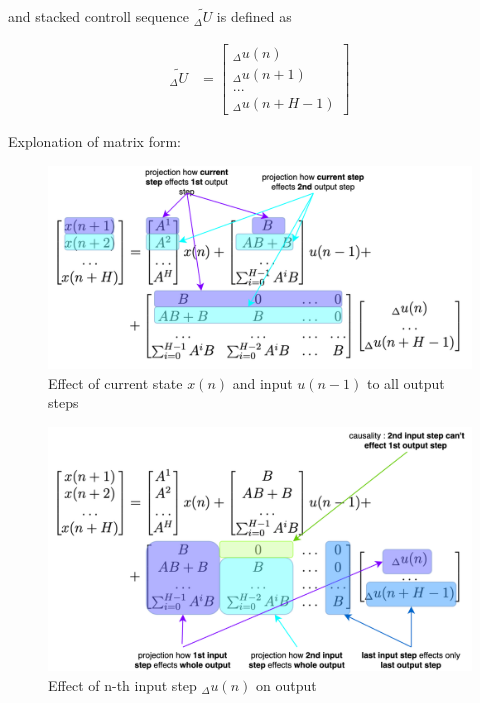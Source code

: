 \documentclass[12pt,twoside,onecolumn,openany,extrafontsizes,dvipsnames]{memoir}
\begin{document}
        and stacked controll sequence $\tilde{_\Delta U}$ is defined as

        \begin{align}   
            \tilde{_\Delta U} &= \begin{bmatrix} _\Delta u(n) \\ _\Delta u(n+1) \\ ... \\ _\Delta u(n+H-1) \end{bmatrix}
            \label{eq:predicted_conrol}
        \end{align}


        Explonation of  matrix form: 
        \begin{figure}[!htb]
            \centering
            \includegraphics[scale=0.8]{../diagrams/control/control-mpc_exp_1.png}
            \caption{Effect of current state $x(n)$ and input $u(n-1)$ to all output steps}
            \label{fig:mpc_exp_1}
        \end{figure}

        \begin{figure}[!htb]
            \centering
            \includegraphics[scale=0.8]{../diagrams/control/control-mpc_exp_2.png}
            \caption{Effect of n-th input step $_\Delta u(n)$ on output}
            \label{fig:mpc_exp_2}
        \end{figure}
\end{document}
